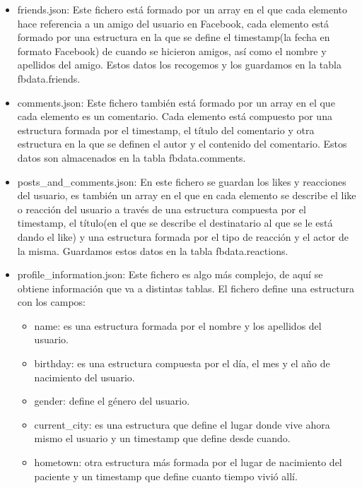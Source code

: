 \begin{itemize}
	\item friends.json: Este fichero está formado por un array en el que cada elemento hace referencia a un amigo del usuario en Facebook, cada elemento está formado por una estructura en la que se define el timestamp(la fecha en formato Facebook) de cuando se hicieron amigos, así como el nombre y apellidos del amigo. Estos datos los recogemos y los guardamos en la tabla fbdata.friends.
	
	\item comments.json: Este fichero también está formado por un array en el que cada elemento es un comentario. Cada elemento está compuesto por una estructura formada por el timestamp, el título del comentario y otra estructura en la que se definen el autor y el contenido del comentario. Estos datos son almacenados en la tabla fbdata.comments.
	
	\item posts\_and\_comments.json: En este fichero se guardan los likes y reacciones del usuario, es también un array en el que en cada elemento se describe el like o reacción del usuario a través de una estructura compuesta por el timestamp, el título(en el que se describe el destinatario al que se le está dando el like) y una estructura formada por el tipo de reacción y el actor de la misma. Guardamos estos datos en la tabla fbdata.reactions.
	
	\item profile\_information.json: Este fichero es algo más complejo, de aquí se obtiene información que va a distintas tablas. El fichero define una estructura con los campos:
	\begin{itemize}
		\item name: es una estructura formada por el nombre y los apellidos del usuario.
		
		\item birthday: es una estructura compuesta por el día, el mes y el año de nacimiento del usuario.
		
		\item gender: define el género del usuario.
		
		\item current\_city: es una estructura que define el lugar donde vive ahora mismo el usuario y un timestamp que define desde cuando.
		
		\item hometown: otra estructura más formada por el lugar de nacimiento del paciente y un timestamp que define cuanto tiempo vivió allí.
		

\end{itemize}
\end{itemize}
